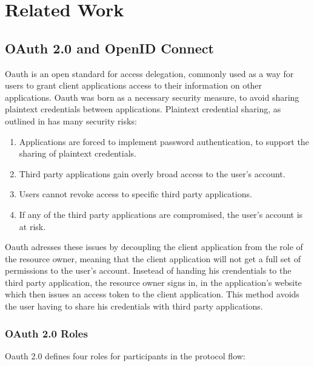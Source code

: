 \chapter{Related Work}
\label{cha:relatedwork}

\section{OAuth 2.0 and OpenID Connect}
\label{cha:relatedwork:oauth}

Oauth is an open standard for access delegation, 
commonly used as a way for users to grant client applications access to their information on other applications.
Oauth was born as a necessary security measure, to avoid sharing plaintext credentials between applications.
Plaintext credential sharing, as outlined in \cite{rfcOauth2} has many security risks:

\begin{enumerate}
  \item Applications are forced to implement password authentication, to support the sharing of plaintext credentials.
  \item Third party applications gain overly broad access to the user's account.
  \item Users cannot revoke access to specific third party applications.
  \item If any of the third party applications are compromised, the user's account is at risk.
\end{enumerate}

Oauth adresses these issues by decoupling the client application from the role of the resource owner,
meaning that the client application will not get a full set of permissions to the user's account.
Insetead of handing his crendentials to the third party application,
the resource owner signs in, in the application's website which then issues an access token to the client application.
This method avoids the user having to share his credentials with third party applications.

\subsection{OAuth 2.0 Roles}

Oauth 2.0 defines four roles for participants in the protocol flow:

